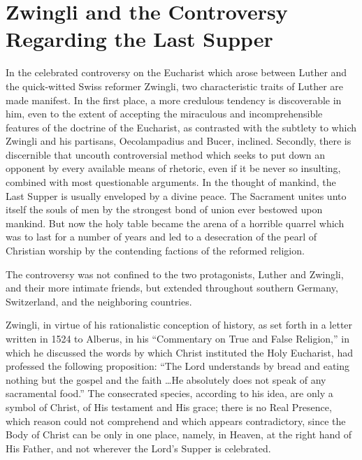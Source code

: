 \section{Zwingli and the Controversy Regarding the Last Supper}

In the celebrated controversy on the Eucharist which arose between
Luther and the quick-witted Swiss reformer Zwingli, two
characteristic traits of Luther are made manifest. In the first place,
a more credulous tendency is discoverable in him, even to the extent of
accepting the miraculous and incomprehensible features
of the doctrine of the Eucharist, as contrasted with the subtlety to
which Zwingli and his partisans, Oecolampadius and Bucer, inclined.
Secondly, there is discernible that uncouth controversial method
which seeks to put down an opponent by every available means of
rhetoric, even if it be never so insulting, combined with most questionable
arguments. In the thought of mankind, the Last Supper is usually
enveloped by a divine peace. The Sacrament unites unto itself the souls
of men by the strongest bond of union ever bestowed upon mankind.
But now the holy table became the arena of a horrible quarrel which
was to last for a number of years and led to a desecration of the pearl
of Christian worship by the contending factions of the reformed religion.

The controversy was not confined to the two protagonists, Luther
and Zwingli, and their more intimate friends, but extended throughout
southern Germany, Switzerland, and the neighboring countries.

Zwingli, in virtue of his rationalistic conception of history, as set
forth in a letter written in 1524 to Alberus, in his “Commentary
on True and False Religion,” in which he discussed the words by
which Christ instituted the Holy Eucharist, had professed the following
proposition: “The Lord understands by bread and eating
nothing but the gospel and the faith \dots He absolutely does not
speak of any sacramental food.” The consecrated species, according
to his idea, are only a symbol of Christ, of His testament and His
grace; there is no Real Presence, which reason could not comprehend
and which appears contradictory, since the Body of Christ can be only
in one place, namely, in Heaven, at the right hand of His Father, and
not wherever the Lord’s Supper is celebrated.

